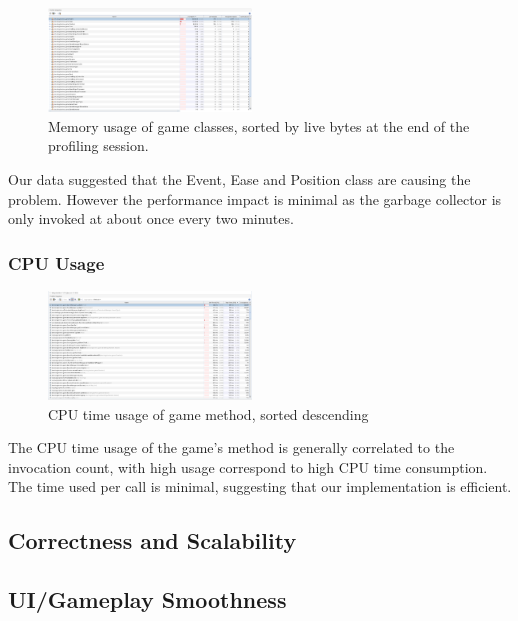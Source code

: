 \documentclass[conference]{IEEEtran}
\begin{document}
\begin{figure}[htbp]
    \centerline{\includegraphics[width=0.48\textwidth]{assets/memory-tree.png}}
    \caption{Memory usage of game classes, sorted by live bytes at the end of the profiling session.}\label{fig:memory-tree}
\end{figure}

Our data suggested that the Event, Ease and Position class are causing the problem.
However the performance impact is minimal as the garbage collector is only invoked at about once every two minutes.

\subsubsection{CPU Usage}

\begin{figure}[htbp]
    \centerline{\includegraphics[width=0.48\textwidth]{assets/cpu-time-tree.png}}
    \caption{CPU time usage of game method, sorted descending}\label{fig:cpu-time-tree}
\end{figure}

The CPU time usage of the game's method is generally correlated to the invocation count, with high usage correspond to high CPU time consumption.
The time used per call is minimal, suggesting that our implementation is efficient.

\subsection{Correctness and Scalability}

\subsection{UI/Gameplay Smoothness}
\end{document}
